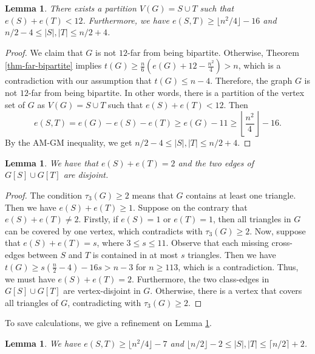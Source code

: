 \documentclass[11pt]{article}
\newtheorem{lemma}[theorem]{Lemma}
\begin{document}
\begin{lemma} \label{rough-part}
There exists a partition $V(G)=S\cup T$ 
such that $e(S) + e(T)<12$. 
Furthermore, we have $e(S,T)\ge \lfloor n^2/4\rfloor -16$ 
and $n/2 -4 \le |S|, |T|\le n/2 +4$. 
\end{lemma}

\begin{proof}
 We claim that $G$ is not $12$-far from being bipartite. 
 Otherwise,  Theorem \ref{thm-far-bipartite} implies 
$ t(G)\ge \frac{n}{6} (e(G) +12 - \frac{n^2}{4} ) > n$, 
which is a contradiction with our assumption that 
$t(G)\le n-4$. Therefore, the graph $G$ is not 
$12$-far from being bipartite. In other words, there is a partition of
the vertex set of $G$ as $V(G)=S\cup T$ such that 
$e(S)+e(T)< 12$. Then 
\[  e(S,T) = e(G)-e(S) - e(T) \ge e(G) -11\ge \left\lfloor \frac{n^2}{4} \right\rfloor -16. \]    
By the AM-GM inequality, we get 
${n}/{2}-4 \le |S|,|T| \le {n}/{2} +4$. 
\end{proof}


\begin{lemma} \label{lem-S+T=2}
We have that $e(S) +e(T) =2$ and the two edges of $G[S]\cup G[T]$ are disjoint. 
\end{lemma} 

\begin{proof} 
The condition $\tau_3(G)\ge 2$ means that $G$ contains at least one triangle. 
Then we have $e(S) +e(T)\ge 1$. 
Suppose on the contrary that $e(S) + e(T)\neq 2$. 
Firstly, if $e(S)=1$ or $e(T)=1$, then 
all triangles in $G$ can be  covered by one vertex, 
which contradicts with $\tau_3(G)\ge 2$. 
Now, suppose that $e(S)+ e(T)=s$, where $3\le s\le 11$. 
Observe that each missing cross-edges between $S$ and $T$ 
is contained in at most $s$ triangles. Then  
we have $ t(G) \ge s (\frac{n}{2} -4) - 16s > n-3$  for $n\ge 113$, 
which is a contradiction.  Thus, we must have 
$ e(S) + e(T)=2$. 
Furthermore, the two class-edges in $G[S]\cup G[T]$ are 
vertex-disjoint in $G$. Otherwise, there is a vertex that covers all triangles of $G$, contradicting with $\tau_3(G)\ge 2$.  
\end{proof}

To save calculations, we give a refinement on Lemma \ref{rough-part}. 

\begin{lemma} \label{lem-pm2}
We have $e(S,T)\ge \lfloor n^2/4\rfloor -7$ and 
$\lfloor n/2 \rfloor - 2 \le |S|, |T|\le \lceil n/2\rceil +2$. 
\end{lemma}
\end{document}
